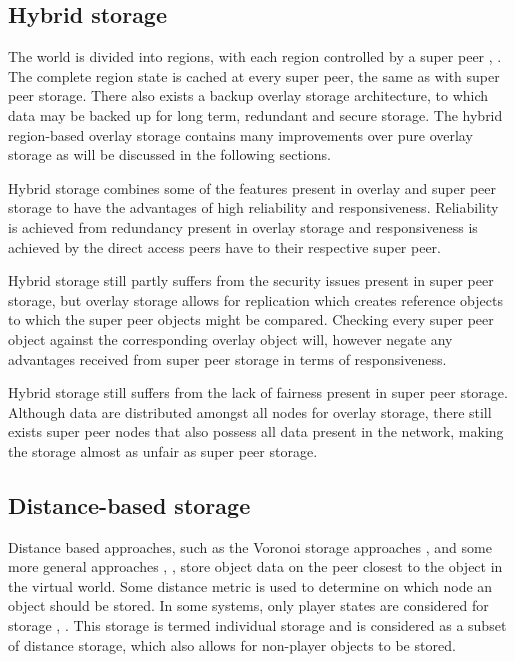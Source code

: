 \documentclass[10pt,a4paper,conference]{IEEEtran}
\begin{document}
\subsection{Hybrid storage}

The world is divided into regions, with each region controlled by a super peer \cite{zoned_federation}, \cite{hybrid_storage1}. The complete region
state is cached at every super peer, the same as with super peer storage. There also exists a backup overlay storage architecture, to which data may
be backed up for long term, redundant and secure storage. The hybrid region-based overlay storage contains many improvements over pure overlay
storage as will be discussed in the following sections.

Hybrid storage combines some of the features present in overlay and super peer storage to have the advantages of high reliability and responsiveness.
Reliability is achieved from redundancy present in overlay storage and responsiveness is achieved by the direct access peers have to their respective
super peer.

Hybrid storage still partly suffers from the security issues present in super peer storage, but overlay storage allows for replication which creates
reference objects to which the super peer objects might be compared. Checking every super peer object against the corresponding overlay object will,
however negate any advantages received from super peer storage in terms of responsiveness.

Hybrid storage still suffers from the lack of fairness present in super peer storage. Although data are distributed amongst all nodes for overlay
storage, there still exists super peer nodes that also possess all data present in the network, making the storage almost as unfair as super peer
storage.

\subsection{Distance-based storage}
\label{classic_distance_based}

Distance based approaches, such as the Voronoi storage approaches \cite{Buyukkaya_voronoi_state_management}, \cite{Hu_voronoi_IM} and some more
general approaches \cite{colyseus_distance_based}, \cite{solipsis}, store object data on the peer closest to the object in the virtual world. Some
distance metric is used to determine on which node an object should be stored. In some systems, only player states are considered for storage
\cite{individual_storage1}, \cite{cheat_proof_playout}. This storage is termed individual storage and is considered as a subset of distance storage,
which also allows for non-player objects to be stored.
\end{document}
